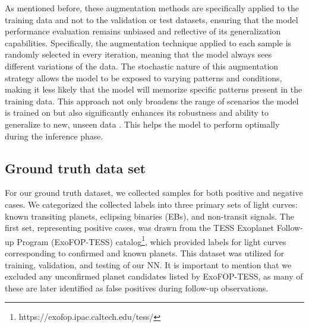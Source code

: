 
As mentioned before, these augmentation methods are specifically applied to the training data and not to the validation or test datasets, ensuring that the model performance evaluation remains unbiased and reflective of its generalization capabilities. Specifically, the augmentation technique applied to each sample is randomly selected in every iteration, meaning that the model always sees different variations of the data. The stochastic nature of this augmentation strategy allows the model to be exposed to varying patterns and conditions, making it less likely that the model will memorize specific patterns present in the training data. This approach not only broadens the range of scenarios the model is trained on but also significantly enhances its robustness and ability to generalize to new, unseen data \citep{shorten2019survey}. This helps the model to perform optimally during the inference phase. \par



\subsection{Ground truth data set}
\label{sec:ground_truth}

For our ground truth dataset, we collected samples for both positive and negative cases. We categorized the collected labels into three primary sets of light curves: known transiting planets, eclipsing binaries (EBs), and non-transit signals. The first set, representing positive cases, was drawn from the TESS Exoplanet Follow-up Program (ExoFOP-TESS) catalog\footnote{https://exofop.ipac.caltech.edu/tess/}, which provided labels for light curves corresponding to confirmed and known planets. This dataset was utilized for training, validation, and testing of our NN. It is important to mention that we excluded any unconfirmed planet candidates listed by ExoFOP-TESS, as many of these are later identified as false positives during follow-up observations. \par


